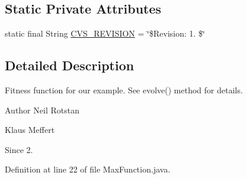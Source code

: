 \subsection*{Static Private Attributes}
\begin{DoxyCompactItemize}
\item 
static final String \hyperlink{classexamples_1_1chrom_init_1_1_max_function_a3516a5f98c1099c6dd4015eaa9e3b821}{C\-V\-S\-\_\-\-R\-E\-V\-I\-S\-I\-O\-N} = \char`\"{}\$Revision\-: 1. \$\char`\"{}
\end{DoxyCompactItemize}


\subsection{Detailed Description}
Fitness function for our example. See evolve() method for details.

\begin{DoxyAuthor}{Author}
Neil Rotstan 

Klaus Meffert 
\end{DoxyAuthor}
\begin{DoxySince}{Since}
2. 
\end{DoxySince}


Definition at line 22 of file Max\-Function.\-java.




